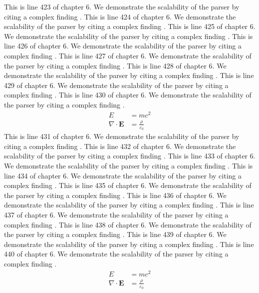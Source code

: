 This is line 423 of chapter 6. We demonstrate the scalability of the parser by citing a complex finding \cite{ref6_423}.
This is line 424 of chapter 6. We demonstrate the scalability of the parser by citing a complex finding \cite{ref6_424}.
This is line 425 of chapter 6. We demonstrate the scalability of the parser by citing a complex finding \cite{ref6_425}.
This is line 426 of chapter 6. We demonstrate the scalability of the parser by citing a complex finding \cite{ref6_426}.
This is line 427 of chapter 6. We demonstrate the scalability of the parser by citing a complex finding \cite{ref6_427}.
This is line 428 of chapter 6. We demonstrate the scalability of the parser by citing a complex finding \cite{ref6_428}.
This is line 429 of chapter 6. We demonstrate the scalability of the parser by citing a complex finding \cite{ref6_429}.
This is line 430 of chapter 6. We demonstrate the scalability of the parser by citing a complex finding \cite{ref6_430}.
\begin{align*}
  E &= mc^2 \\
  \nabla \cdot \mathbf{E} &= \frac{\rho}{\varepsilon_0}
\end{align*}
This is line 431 of chapter 6. We demonstrate the scalability of the parser by citing a complex finding \cite{ref6_431}.
This is line 432 of chapter 6. We demonstrate the scalability of the parser by citing a complex finding \cite{ref6_432}.
This is line 433 of chapter 6. We demonstrate the scalability of the parser by citing a complex finding \cite{ref6_433}.
This is line 434 of chapter 6. We demonstrate the scalability of the parser by citing a complex finding \cite{ref6_434}.
This is line 435 of chapter 6. We demonstrate the scalability of the parser by citing a complex finding \cite{ref6_435}.
This is line 436 of chapter 6. We demonstrate the scalability of the parser by citing a complex finding \cite{ref6_436}.
This is line 437 of chapter 6. We demonstrate the scalability of the parser by citing a complex finding \cite{ref6_437}.
This is line 438 of chapter 6. We demonstrate the scalability of the parser by citing a complex finding \cite{ref6_438}.
This is line 439 of chapter 6. We demonstrate the scalability of the parser by citing a complex finding \cite{ref6_439}.
This is line 440 of chapter 6. We demonstrate the scalability of the parser by citing a complex finding \cite{ref6_440}.
\begin{align*}
  E &= mc^2 \\
  \nabla \cdot \mathbf{E} &= \frac{\rho}{\varepsilon_0}
\end{align*}
